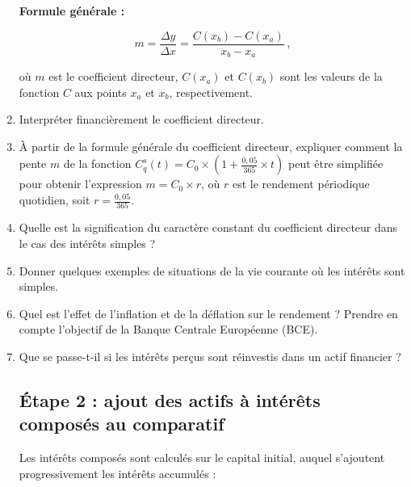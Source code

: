 \documentclass{article}
\begin{document}
\begin{enumerate}[label=\textbf{Q1.\arabic*}]
\begin{tcolorbox}
        \textbf{Formule générale :}
    
        \[
            m = \frac{\Delta y}{\Delta x} = \frac{C(x_b) - C(x_a)}{x_b - x_a}\,,
        \]
    
        où \( m \) est le coefficient directeur, \( C(x_a) \) et \( C(x_b) \) sont les valeurs de la fonction \( C \) aux points \( x_a \) et \( x_b \), respectivement.
    \end{tcolorbox}

    \item Interpréter financièrement le coefficient directeur.

    \item À partir de la formule générale du coefficient directeur, expliquer comment la pente \( m \) de la fonction \( C_q^s(t) = C_0 \times \left(1 + \frac{0{,}05}{365} \times t\right) \) peut être simplifiée pour obtenir l'expression \( m = C_0 \times r \), où \( r \) est le rendement périodique quotidien, soit \( r = \frac{0{,}05}{365} \).

    \item Quelle est la signification du caractère constant du coefficient directeur dans le cas des intérêts simples ?

    \item Donner quelques exemples de situations de la vie courante où les intérêts sont simples.

    \item Quel est l'effet de l'inflation et de la déflation sur le rendement ? Prendre en compte l'objectif de la Banque Centrale Européenne (BCE).

    \item Que se passe-t-il si les intérêts perçus sont réinvestis dans un actif financier ?


    \subsection*{Étape 2 : ajout des actifs à intérêts composés au comparatif}
\begin{tcolorbox}[
    colback=lightgreen, 
    colframe=lightgreen, 
    boxrule=0.5pt, 
    arc=0pt, 
    left=10pt, 
    right=10pt, 
    top=6pt, 
    bottom=6pt, 
    boxsep=2pt, 
    before upper={\faLightbulb\hspace{10pt}}
]
    Les intérêts composés sont calculés sur le capital initial, auquel s'ajoutent progressivement les intérêts accumulés :
    


\end{tcolorbox}
\end{enumerate}
\end{document}
